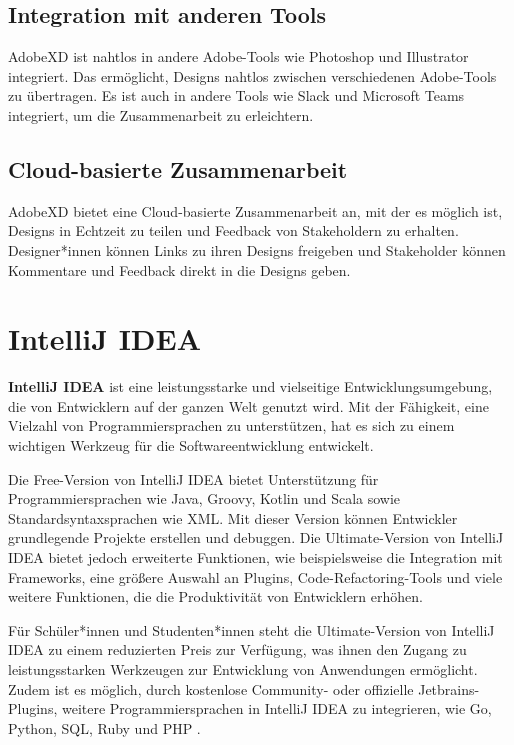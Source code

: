 \subsection*{Integration mit anderen Tools} 
AdobeXD ist nahtlos in andere Adobe-Tools wie Photoshop und Illustrator integriert. Das ermöglicht, Designs nahtlos zwischen verschiedenen Adobe-Tools zu übertragen. 
Es ist auch in andere Tools wie Slack und Microsoft Teams integriert, um die Zusammenarbeit zu erleichtern.

\subsection*{Cloud-basierte Zusammenarbeit} 
AdobeXD bietet eine Cloud-basierte Zusammenarbeit an, mit der es möglich ist, Designs in Echtzeit zu teilen und Feedback von Stakeholdern zu erhalten. 
Designer*innen können Links zu ihren Designs freigeben und Stakeholder können Kommentare und Feedback direkt in die Designs geben.

\section{IntelliJ IDEA}

\textbf{IntelliJ IDEA} ist eine leistungsstarke und vielseitige Entwicklungsumgebung, die von Entwicklern auf der ganzen Welt genutzt wird. Mit der Fähigkeit, eine Vielzahl von Programmiersprachen zu unterstützen, hat es sich zu einem wichtigen Werkzeug für die Softwareentwicklung entwickelt.

Die Free-Version von IntelliJ IDEA bietet Unterstützung für Programmiersprachen wie Java, Groovy, Kotlin und Scala sowie Standardsyntaxsprachen wie XML. Mit dieser Version können Entwickler grundlegende Projekte erstellen und debuggen. Die Ultimate-Version von IntelliJ IDEA bietet jedoch erweiterte Funktionen, wie beispielsweise die Integration mit Frameworks, eine größere Auswahl an Plugins, Code-Refactoring-Tools und viele weitere Funktionen, die die Produktivität von Entwicklern erhöhen.

Für Schüler*innen und Studenten*innen steht die Ultimate-Version von IntelliJ IDEA zu einem reduzierten Preis zur Verfügung, was ihnen den Zugang zu leistungsstarken Werkzeugen zur Entwicklung von Anwendungen ermöglicht. Zudem ist es möglich, durch kostenlose Community- oder offizielle Jetbrains-Plugins, weitere Programmiersprachen in IntelliJ IDEA zu integrieren, wie Go, Python, SQL, Ruby und PHP \cite{IntelliJ}.

